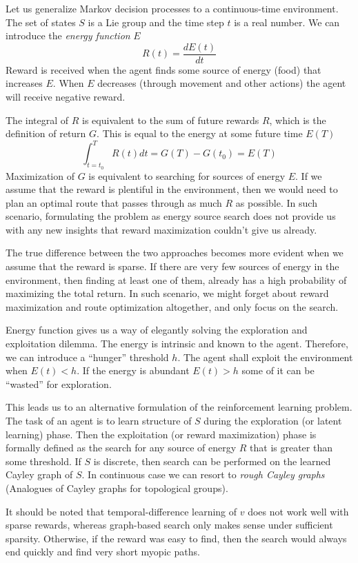 \documentclass[12pt]{article}
\begin{document}
Let us generalize Markov decision processes to a continuous-time environment. The set of states $S$ is a Lie group and the time step $t$ is a real number. We can introduce the \textit{energy function} $E$
\[
R(t) = \frac{dE(t)}{dt}
\]
Reward is received when the agent finds some source of energy (food) that increases $E$. When $E$ decreases (through movement and other actions) the agent will receive negative reward. 

The integral of $R$ is equivalent to the sum of future rewards $R$, which is the definition of return $G$. This is equal to the energy at some future time $E(T)$
\[
\int_{t=t_0}^{T} R(t) dt = G(T) - G(t_0) = E(T)
\]
Maximization of $G$ is equivalent to searching for sources of energy $E$. If we assume that the reward is plentiful in the environment, then we would need to plan an optimal route that passes through as much $R$ as possible. In such scenario, formulating the problem as energy source search does not provide us with any new insights that reward maximization couldn't give us already. 

The true difference between the two approaches becomes more evident when we assume that the reward is sparse. If there are very few sources of energy in the environment, then finding at least one of them, already has a high probability of maximizing the total return. In such scenario, we might forget about reward maximization and route optimization altogether, and only focus on the search. 

Energy function gives us a way of elegantly solving the exploration and exploitation dilemma. The energy is intrinsic and known to the agent. Therefore, we can introduce a ``hunger'' threshold $h$. The agent shall exploit the environment when $E(t) < h$. If the energy is abundant $E(t)>h$ some of it can be ``wasted'' for exploration. 

This leads us to an alternative formulation of the reinforcement learning problem.
The task of an agent is to learn structure of $S$ during the exploration (or latent learning) phase. Then the exploitation (or reward maximization) phase is formally defined as the search for any source of energy $R$ that is greater than some threshold. If $S$ is discrete, then search can be performed on the learned Cayley graph of $S$. In continuous case we can resort to \textit{rough Cayley graphs} (Analogues of Cayley graphs for topological groups). 

It should be noted that temporal-difference learning of $v$ does not work well with sparse rewards, whereas graph-based search only makes sense under sufficient sparsity. Otherwise, if the reward was easy to find, then the search would always end quickly and find very short myopic paths.
\end{document}
